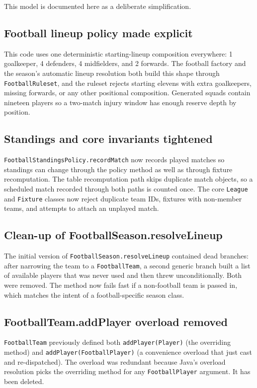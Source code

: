 \documentclass[11pt, a4paper]{article}
\newcommand{\code}[1]{\texttt{#1}}
\begin{document}
This model is documented here as a deliberate simplification.

\subsection{Football lineup policy made explicit}

This code uses one deterministic starting-lineup composition everywhere:
1 goalkeeper, 4 defenders, 4 midfielders, and 2 forwards. The football
factory and the season's automatic lineup resolution both build this
shape through \code{FootballRuleset}, and the ruleset rejects starting
elevens with extra goalkeepers, missing forwards, or any other positional
composition. Generated squads contain nineteen players so a two-match
injury window has enough reserve depth by position.

\subsection{Standings and core invariants tightened}

\code{FootballStandingsPolicy.recordMatch} now records played matches so
standings can change through the policy method as well as through fixture
recomputation. The table recomputation path skips duplicate match objects,
so a scheduled match recorded through both paths is counted once. The core
\code{League} and \code{Fixture} classes now reject duplicate team IDs,
fixtures with non-member teams, and attempts to attach an unplayed match.

\subsection{Clean-up of FootballSeason.resolveLineup}

The initial version of \code{FootballSeason.resolveLineup} contained
dead branches: after narrowing the team to a \code{FootballTeam}, a second
generic branch built a list of available players that was never used and
then threw unconditionally. Both were removed. The method now fails
fast if a non-football team is passed in, which matches the intent of a
football-specific season class.

\subsection{FootballTeam.addPlayer overload removed}

\code{FootballTeam} previously defined both
\code{addPlayer(Player)} (the overriding method) and
\code{addPlayer(\allowbreak FootballPlayer)} (a convenience overload that just cast
and re-dispatched). The overload was redundant because Java's overload
resolution picks the overriding method for any \code{FootballPlayer}
argument. It has been deleted.
\end{document}
